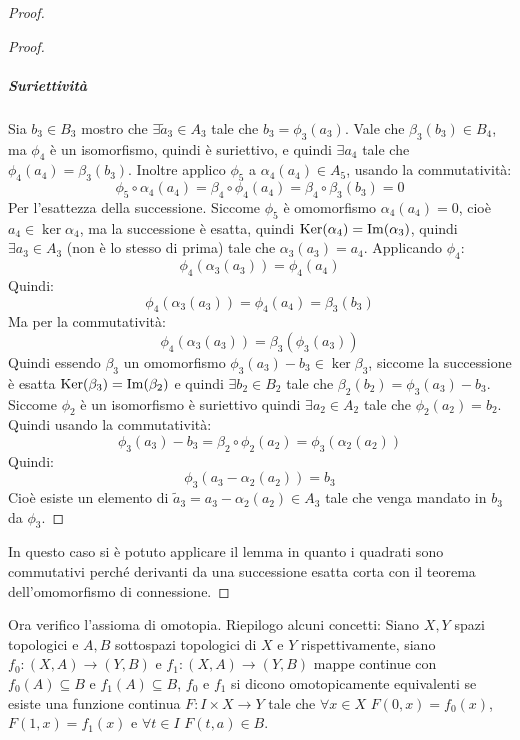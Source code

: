 \begin{proof}
\begin{proof}
    \subparagraph{Suriettività} Sia $ b_3 \in B_3 $ mostro che
    $ \exists \tilde{a}_3 \in A_3 $ tale che $ b_3 = \phi_3(a_3) $. Vale che
    $ \beta_3(b_3) \in B_4 $, ma $ \phi_4 $ è un isomorfismo, quindi è suriettivo, e
    quindi $ \exists a_4 $ tale che $ \phi_4(a_4) = \beta_3(b_3) $. Inoltre applico $ \phi_5 $
    a $ \alpha_4(a_4) \in A_5 $, usando la commutatività:
    \[
      \phi_5 \circ \alpha_4 (a_4) = \beta_4 \circ \phi_4 (a_4) = \beta_4 \circ \beta_3 (b_3) = 0
    \]
    Per l'esattezza della successione.
    Siccome $ \phi_5 $ è omomorfismo $ \alpha_4(a_4) = 0 $, cioè $ a_4 \in \ker{\alpha_4} $,
    ma la successione è esatta, quindi $ \mathrm{Ker}( \alpha_4) = \mathrm{Im}( \alpha_3 ) $, quindi
    $ \exists a_3 \in A_3 $ (non è lo stesso di prima) tale che $ \alpha_3(a_3) = a_4 $.
    Applicando $ \phi_4 $:
    \[
      \phi_4 (\alpha_3(a_3)) = \phi_4(a_4)
    \]
    Quindi:
    \[
      \phi_4 (\alpha_3(a_3)) = \phi_4(a_4) = \beta_3(b_3)
    \]
    Ma per la commutatività:
    \[
      \phi_4 (\alpha_3(a_3)) = \beta_3(\phi_3(a_3))
    \]
    Quindi essendo $ \beta_3 $ un omomorfismo $ \phi_3(a_3) - b_3 \in \ker{\beta_3} $,
    siccome la successione è esatta $ \mathrm{Ker}( \beta_3) = \mathrm{Im}( \beta_2 ) $ e quindi
    $ \exists b_2 \in B_2 $ tale che $ \beta_2(b_2) = \phi_3(a_3) - b_3 $. Siccome $ \phi_2 $
    è un isomorfismo è suriettivo quindi $ \exists a_2 \in A_2 $ tale che $ \phi_2(a_2) = b_2 $.
    Quindi usando la commutatività:
    \[
      \phi_3(a_3) - b_3 = \beta_2 \circ \phi_2 (a_2) = \phi_3(\alpha_2(a_2))
    \]
    Quindi:
    \[
      \phi_3(a_3 - \alpha_2(a_2)) = b_3
    \]
    Cioè esiste un elemento di $ \tilde{a}_3 = a_3 - \alpha_2(a_2) \in A_3 $ tale che
    venga mandato in $ b_3 $ da $ \phi_3 $.
  \end{proof}
  In questo caso si è potuto applicare il lemma in quanto i quadrati sono commutativi
  perché derivanti da una successione esatta corta con il teorema dell'omomorfismo
  di connessione.
\end{proof}


Ora verifico l'assioma di omotopia. Riepilogo alcuni concetti: Siano $ X, Y $
spazi topologici e $ A, B $ sottospazi topologici di $ X $ e $ Y $
rispettivamente, siano $ f_0 \colon (X, A) \to (Y,B) $ e
$ f_1 \colon (X,A) \to (Y,B) $ mappe continue con $ f_0(A) \subseteq B $ e
$ f_1(A) \subseteq B $, $ f_0 $ e $ f_1 $ si dicono omotopicamente equivalenti se esiste
una funzione continua $ F \colon I \times X \to Y $ tale che $ \forall x \in X $
$ F(0,x) = f_0(x) $, $ F(1,x) = f_1(x) $ e $ \forall t \in I $ $ F(t,a) \in B $.

